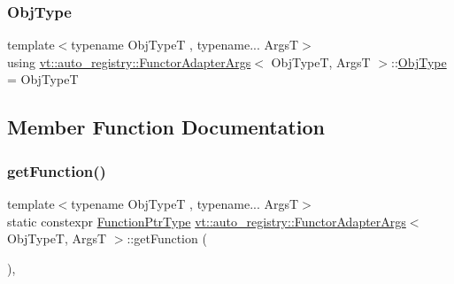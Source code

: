 \subsubsection{\texorpdfstring{Obj\+Type}{ObjType}}
{\footnotesize\ttfamily template$<$typename Obj\+TypeT , typename... ArgsT$>$ \\
using \hyperlink{structvt_1_1auto__registry_1_1_functor_adapter_args}{vt\+::auto\+\_\+registry\+::\+Functor\+Adapter\+Args}$<$ Obj\+TypeT, ArgsT $>$\+::\hyperlink{structvt_1_1auto__registry_1_1_functor_adapter_args_ad081c757043c3f9a340c09e1d66822fa}{Obj\+Type} =  Obj\+TypeT}



\subsection{Member Function Documentation}
\mbox{\label{structvt_1_1auto__registry_1_1_functor_adapter_args_a9652984336f3dcc10449d979614c5a00}} 
\subsubsection{\texorpdfstring{get\+Function()}{getFunction()}}
{\footnotesize\ttfamily template$<$typename Obj\+TypeT , typename... ArgsT$>$ \\
static constexpr \hyperlink{structvt_1_1auto__registry_1_1_functor_adapter_args_a8845389dd3d7c6686f20764a077d1337}{Function\+Ptr\+Type} \hyperlink{structvt_1_1auto__registry_1_1_functor_adapter_args}{vt\+::auto\+\_\+registry\+::\+Functor\+Adapter\+Args}$<$ Obj\+TypeT, ArgsT $>$\+::get\+Function (\begin{DoxyParamCaption}{ }\end{DoxyParamCaption})\hspace{0.3cm}{\ttfamily [inline]}, {\ttfamily [static]}}

\mbox{\label{structvt_1_1auto__registry_1_1_functor_adapter_args_ae13e4cf7fdf72608dd681cc55d26c63f}} 
